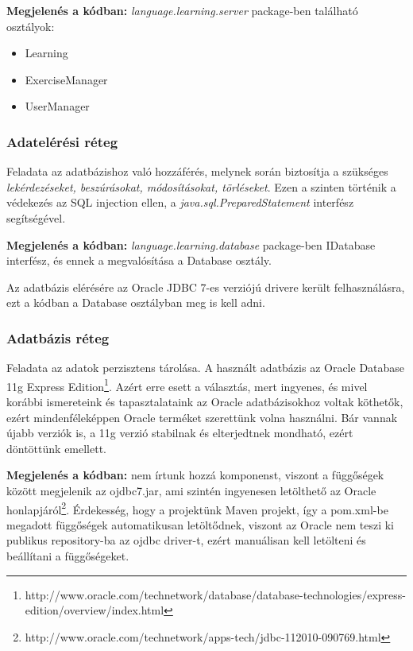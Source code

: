 \documentclass[11pt, a4paper]{article}
\begin{document}
    \textbf{Megjelenés a kódban:} \textit{language.learning.server} package-ben található osztályok: 
    \begin{itemize}
    	\item Learning
    	\item ExerciseManager
    	\item UserManager
    \end{itemize}
    
    \subsubsection{Adatelérési réteg}
    Feladata az adatbázishoz való hozzáférés, melynek során biztosítja a szükséges \textit{lekérdezéseket, beszúrásokat, módosításokat, törléseket}. Ezen a szinten történik a védekezés az SQL injection ellen, a \textit{java.sql.PreparedStatement} interfész segítségével.
    
    \textbf{Megjelenés a kódban:} \textit{language.learning.database} package-ben IDatabase interfész, és ennek a megvalósítása a Database osztály.
    
    Az adatbázis elérésére az Oracle JDBC 7-es verziójú drivere került felhasználásra, ezt a kódban a Database osztályban meg is kell adni.
    
    \subsubsection{Adatbázis réteg}
    Feladata az adatok perzisztens tárolása. A használt adatbázis az Oracle Database 11g Express Edition\footnote{http://www.oracle.com/technetwork/database/database-technologies/express-edition/overview/index.html}. Azért erre esett a választás, mert ingyenes, és mivel korábbi ismereteink és tapasztalataink az Oracle adatbázisokhoz voltak köthetők, ezért mindenféleképpen Oracle terméket szerettünk volna használni. Bár vannak újabb verziók is, a 11g verzió stabilnak és elterjedtnek mondható, ezért döntöttünk emellett.
    
   \textbf{ Megjelenés a kódban:} nem írtunk hozzá komponenst, viszont a függőségek között megjelenik az ojdbc7.jar, ami szintén ingyenesen letölthető az Oracle honlapjáról\footnote{http://www.oracle.com/technetwork/apps-tech/jdbc-112010-090769.html}. Érdekesség, hogy a projektünk Maven projekt, így a pom.xml-be megadott függőségek automatikusan letöltődnek, viszont az Oracle nem teszi ki publikus repository-ba az ojdbc driver-t, ezért manuálisan kell letölteni és beállítani a függőségeket.
    
\end{document}
